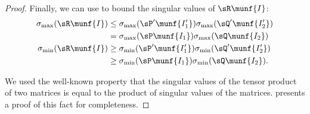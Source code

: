 \begin{proof}
  Finally, we can use  to bound the singular values of $\sR\munf{I}$:
  \begin{align*}
    \sigma_{\max}(\sR\munf{I}) 
    &\le \sigma_{\max}({\sP'}\munf{I'_1}) \sigma_{\max}({\sQ'}\munf{I'_2}) \\
      &= \sigma_{\max}(\sP\munf{I_1}) \sigma_{\max}(\sQ\munf{I_2}) \\
    \sigma_{\min}(\sR\munf{I})  
    &\ge \sigma_{\min}({\sP'}\munf{I'_1}) \sigma_{\min}({\sQ'}\munf{I'_2}) \\
      &\ge \sigma_{\min}(\sP\munf{I_1}) \sigma_{\min}(\sQ\munf{I_2}).
  \end{align*}

  We used the well-known property that the singular values of the tensor product of two matrices is equal to the product of singular values of the matrices.  presents a proof of this fact for completeness.
\end{proof}


